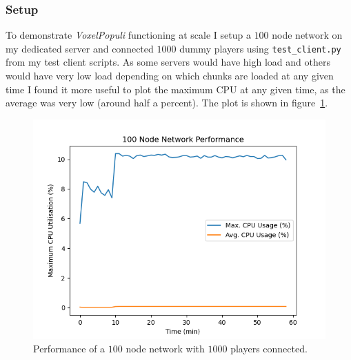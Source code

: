 \documentclass[12pt,notitlepage,a4paper]{report}
\newcommand{\voxpop}{\emph{VoxelPopuli}}
\begin{document}
	\subsubsection{Setup}
	To demonstrate \voxpop{} functioning at scale I setup a $100$ node network on my dedicated server and connected $1000$ dummy players using {\tt test\_client.py} from my test client scripts. As some servers would have high load and others would have very low load depending on which chunks are loaded at any given time I found it more useful to plot the maximum CPU at any given time, as the average was very low (around half a percent). The plot is shown in figure~\ref{fig:big}.
	\begin{figure}[!ht]
		\includegraphics[width=\textwidth]{100node.png}
		\caption{Performance of a $100$ node network with $1000$ players connected.}
		\label{fig:big}
	\end{figure}
\end{document}
